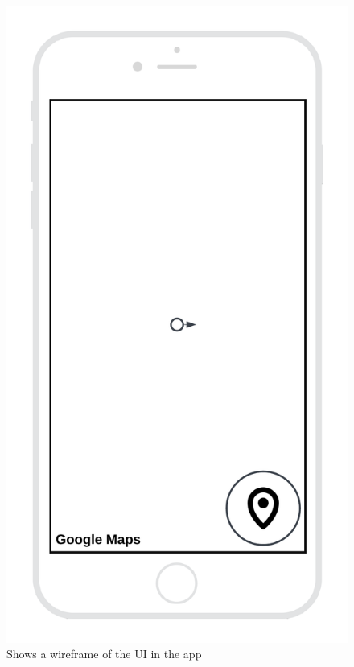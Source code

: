 \documentclass{article}
\begin{document}
\begin{figure}[H]
    \centering
    \includegraphics[scale=0.12]{graphics/wireframe_app.png}
    \caption{Shows a wireframe of the UI in the app}
    \label{fig:wireframe_app}
\end{figure}


\newpage
\end{document}
